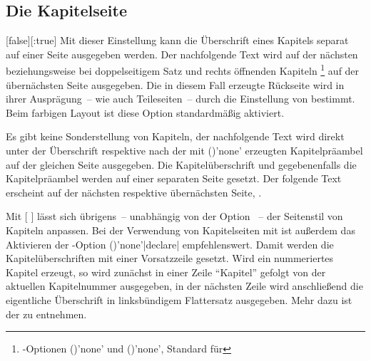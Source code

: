 \begin{Declaration*}{}
\begin{Declaration*}{}
\begin{Declaration*}{}
\subsection{Die Kapitelseite}
\begin{Declaration}{}%
  [false][:true]%
\printdeclarationlist%
%
%
%
%
%
%
Mit dieser Einstellung kann die Überschrift eines Kapitels separat auf einer 
Seite ausgegeben werden. Der nachfolgende Text wird auf der nächsten 
beziehungsweise bei doppelseitigem Satz und rechts öffnenden Kapiteln%
\footnote{%
  \KOMAScript-Optionen ()'none' und 
  ()'none', Standard für 
}
auf der übernächsten Seite ausgegeben. Die in diesem Fall erzeugte Rückseite 
wird in ihrer Ausprägung~-- wie auch Teileseiten~-- durch die Einstellung von 
 bestimmt. Beim farbigen Layout ist diese Option 
standardmäßig aktiviert. \notudscrartcl
%
\begin{values}{}
\itemfalse
  Es gibt keine Sonderstellung von Kapiteln, der nachfolgende Text wird direkt 
  unter der Überschrift respektive nach der mit 
  ()'none' erzeugten 
  Kapitelpräambel auf der gleichen Seite ausgegeben.
\itemtrue*
  Die Kapitelüberschrift und gegebenenfalls die Kapitelpräambel werden auf 
  einer separaten Seite gesetzt. Der folgende Text erscheint auf der nächsten 
  respektive übernächsten Seite, .
\end{values}
%
Mit [%
]
lässt sich übrigens~-- unabhängig von der Option ~-- der 
Seitenstil von Kapiteln anpassen. Bei der Verwendung von Kapitelseiten mit 
 ist außerdem das Aktivieren der \KOMAScript-Option 
()'none'|declare| 
empfehlenswert. Damit werden die Kapitelüberschriften mit einer Vorsatzzeile 
gesetzt. Wird ein nummeriertes Kapitel erzeugt, so wird zunächst in einer Zeile 
\enquote{Kapitel} gefolgt von der aktuellen Kapitelnummer ausgegeben, in der 
nächsten Zeile wird anschließend die eigentliche Überschrift in linksbündigem 
Flattersatz ausgegeben. Mehr dazu ist der  
zu entnehmen.
\end{Declaration}


\end{Declaration*}
\end{Declaration*}
\end{Declaration*}
